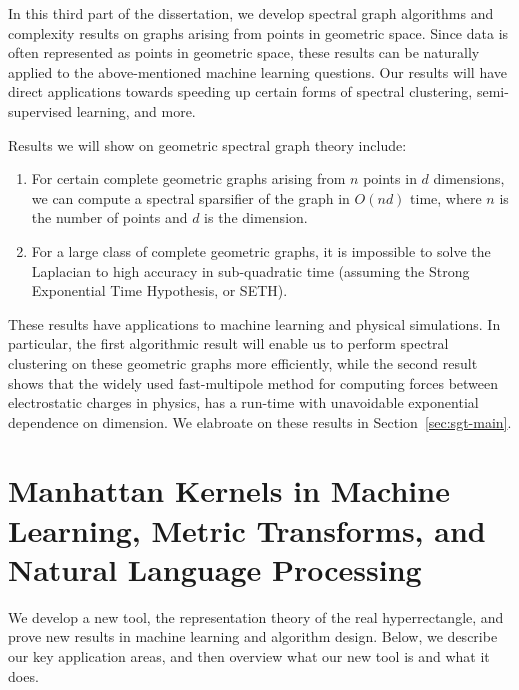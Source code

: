   In this third part of the dissertation, we develop spectral graph
  algorithms and complexity results on graphs arising from points in geometric space. Since
  data is often represented as points in geometric space, these
  results can be naturally applied to the above-mentioned machine
  learning questions. Our results will have direct applications towards
  speeding up certain forms of spectral clustering, semi-supervised
  learning, and more.

  Results we will show on geometric spectral graph theory include: 
  \begin{enumerate}
  \item For certain complete geometric graphs arising from $n$ points in
  $d$ dimensions, we can compute a spectral
  sparsifier of the graph in $O(nd)$ time, where $n$ is the number of
  points and $d$ is the dimension.
  \item  For a large class of complete geometric graphs, it is
  impossible to solve the Laplacian to high accuracy in sub-quadratic
  time (assuming the Strong Exponential Time Hypothesis, or SETH).
  \end{enumerate}
  These results have applications to machine learning and physical
  simulations. In particular, the first algorithmic result will enable us to perform
  spectral clustering on these geometric graphs more efficiently, while
  the second result shows that the widely used fast-multipole method for
  computing forces between electrostatic charges in physics, has a
  run-time with unavoidable exponential dependence on dimension. We
  elabroate on these results in Section~\ref{sec:sgt-main}.
  

\iffalse
\section{Manhattan Kernels in Machine Learning, Metric Transforms, and Natural
  Language Processing}
      We develop a new tool, the representation theory of the real
      hyperrectangle, and prove new results in machine learning and algorithm design. Below, we describe our key application
      areas, and then overview what our new tool is and what it does.
